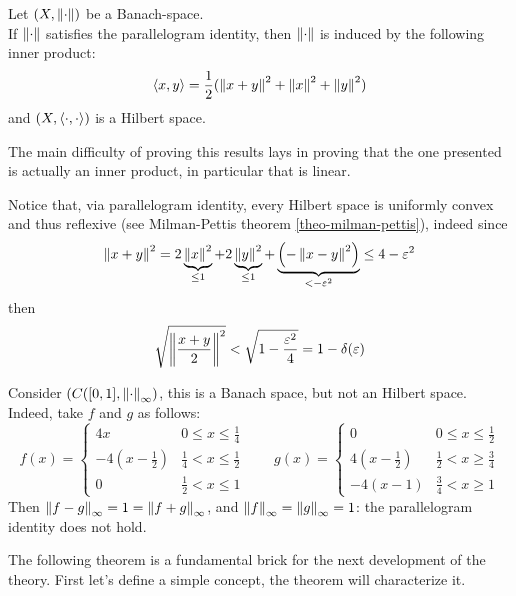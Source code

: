 \begin{theo}
	Let $(X, \left\lVert\cdot\right\rVert)$ be a Banach-space.\\
	If $\left\lVert\cdot\right\rVert$ satisfies the parallelogram identity, then $\left\lVert\cdot\right\rVert$ is induced by the following inner product:
	$$
	\left\langle x, y\right\rangle 
	= \frac 1 2 ( \left\lVert x+y\right\rVert^2+\left\lVert x\right\rVert^2+\left\lVert y\right\rVert^2)
	$$
	and $(X, \left\langle\cdot,  \cdot\right\rangle)$ is a Hilbert space.\footnotemark{}
\end{theo}

The main difficulty of proving this results lays in proving that the one presented is actually an inner product, in particular that is linear. 

Notice that, via parallelogram identity, every Hilbert space is uniformly convex and thus reflexive (see Milman-Pettis theorem \vref{theo-milman-pettis}), indeed since
$$
	\left\lVert x+y\right\rVert^2 =2\underbrace{\left\lVert x\right\rVert^2}_{\leq 1} +2\underbrace{\left\lVert y\right\rVert ^2}_{\leq 1} +\underbrace{\left( -\left\lVert x-y\right\rVert^2\right)}_{< -\varepsilon ^2} \leq 4-\varepsilon ^2
$$
then
$$
	\sqrt{\left\lVert\frac{x+y}2\right\rVert^2} < \sqrt{1-\frac{\varepsilon ^2}{4}} =1-\delta ( \varepsilon )
$$

\begin{exam}
	Consider $(C([0,1], \left\lVert\cdot\right\rVert_\infty )$, this is a Banach space, but not an Hilbert space.\\
	Indeed, take $f$ and $g$ as follows:
	$$f(x) = 
	\begin{cases}
	4x & 0 \leq x \leq \frac 1 4\\
	-4(x-\frac 1 2 ) & \frac 1 4 < x \leq \frac 1 2\\
	0 & \frac 1 2 < x \leq 1
	\end{cases}
	\qquad 
	g(x) = 
	\begin{cases}
	0 &0 \leq x \leq \frac 1 2 \\
	4(x- \frac 1 2) & \frac 1 2 < x \geq \frac 3 4 \\
	-4(x-1) & \frac 3 4 < x \geq 1
	\end{cases}
	$$
	Then $\left\lVert f-g\right\rVert_\infty = 1 = \left\lVert f + g\right\rVert_\infty$, and $\left\lVert f\right\rVert_\infty = \left\lVert g\right\rVert_\infty = 1$: the parallelogram identity does not hold.
\end{exam}

The following theorem is a fundamental brick for the next development of the theory. First let's define a simple concept, the theorem will characterize it.

